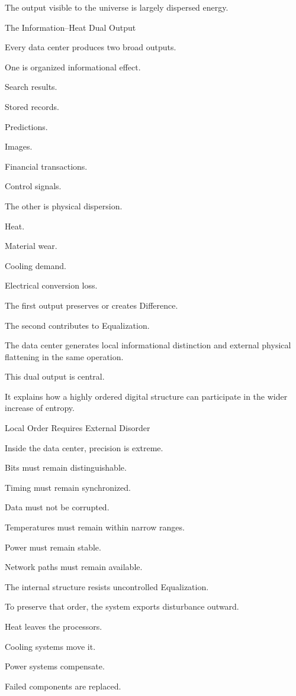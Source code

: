 The output visible to the universe is largely dispersed energy.

The Information–Heat Dual Output

Every data center produces two broad outputs.

One is organized informational effect.

Search results.

Stored records.

Predictions.

Images.

Financial transactions.

Control signals.

The other is physical dispersion.

Heat.

Material wear.

Cooling demand.

Electrical conversion loss.

The first output preserves or creates Difference.

The second contributes to Equalization.

The data center generates local informational distinction and external physical flattening in the same operation.

This dual output is central.

It explains how a highly ordered digital structure can participate in the wider increase of entropy.

Local Order Requires External Disorder

Inside the data center, precision is extreme.

Bits must remain distinguishable.

Timing must remain synchronized.

Data must not be corrupted.

Temperatures must remain within narrow ranges.

Power must remain stable.

Network paths must remain available.

The internal structure resists uncontrolled Equalization.

To preserve that order, the system exports disturbance outward.

Heat leaves the processors.

Cooling systems move it.

Power systems compensate.

Failed components are replaced.


